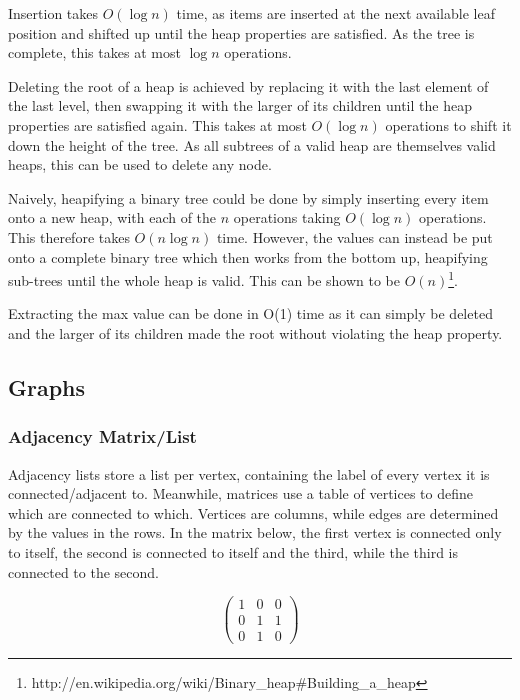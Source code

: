 \documentclass[]{article}
\begin{document}
Insertion takes $O(\log{n})$ time, as items are inserted at the next available leaf position and shifted up until the heap properties are satisfied. As the tree is complete, this takes at most $\log{n}$ operations.

Deleting the root of a heap is achieved by replacing it with the last element of the last level, then swapping it with the larger of its children until the heap properties are satisfied again. This takes at most $O(\log{n})$ operations to shift it down the height of the tree. As all subtrees of a valid heap are themselves valid heaps, this can be used to delete any node.

Naively, heapifying a binary tree could be done by simply inserting every item onto a new heap, with each of the $n$ operations taking $O(\log{n})$ operations. This therefore takes $O(n\log{n})$ time. However, the values can instead be put onto a complete binary tree which then works from the bottom up, heapifying sub-trees until the whole heap is valid. This can be shown to be $O(n)$\footnote{http://en.wikipedia.org/wiki/Binary\_heap\#Building\_a\_heap}.

Extracting the max value can be done in O(1) time as it can simply be deleted and the larger of its children made the root without violating the heap property.

\pagebreak

\subsection{Graphs}

\subsubsection{Adjacency Matrix/List}

Adjacency lists store a list per vertex, containing the label of every vertex it is connected/adjacent to. Meanwhile, matrices use a table of vertices to define which are connected to which. Vertices are columns, while edges are determined by the values in the rows. In the matrix below, the first vertex is connected only to itself, the second is connected to itself and the third, while the third is connected to the second.

\[ \left( \begin{array}{ccc}
1 & 0 & 0 \\
0 & 1 & 1 \\
0 & 1 & 0 \end{array} \right)\] 
\end{document}

